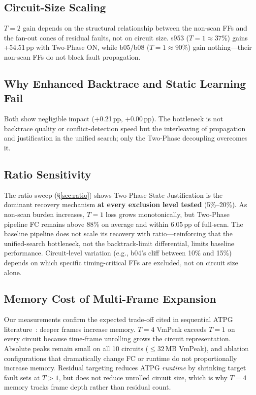 \documentclass[conference]{IEEEtran}
\begin{document}
\subsection{Circuit-Size Scaling}
$T{=}2$ gain depends on the structural relationship between the non-scan FFs and
the fan-out cones of residual faults, not on circuit size. s953 ($T{=}1{\approx}37\%$)
gains +54.51\,pp with Two-Phase ON, while b05/b08 ($T{=}1{\approx}90\%$) gain
nothing---their non-scan FFs do not block fault propagation.

\subsection{Why Enhanced Backtrace and Static Learning Fail}
Both show negligible impact (+0.21\,pp, +0.00\,pp). The bottleneck is not
backtrace quality or conflict-detection speed but the interleaving of
propagation and justification in the unified search; only the Two-Phase
decoupling overcomes it.

\subsection{Ratio Sensitivity}
The ratio sweep (\S\ref{sec:ratio}) shows Two-Phase State Justification is the
dominant recovery mechanism \textbf{at every exclusion level tested} (5\%--20\%).
As non-scan burden increases, $T{=}1$ loss grows monotonically, but Two-Phase
pipeline FC remains above 88\% on average and within 6.05\,pp of full-scan. The
baseline pipeline does not scale its recovery with ratio---reinforcing that the
unified-search bottleneck, not the backtrack-limit differential, limits baseline
performance. Circuit-level variation (e.g., b04's cliff between 10\% and 15\%)
depends on which specific timing-critical FFs are excluded, not on circuit size
alone.

\subsection{Memory Cost of Multi-Frame Expansion}
Our measurements confirm the expected trade-off cited in sequential ATPG
literature~\cite{ref3}: deeper frames increase memory. $T{=}4$ VmPeak exceeds
$T{=}1$ on every circuit because time-frame unrolling grows the circuit
representation. Absolute peaks remain small on all 10 circuits (${\leq}32$\,MB
VmPeak), and ablation configurations that dramatically change FC or runtime do
not proportionally increase memory. Residual targeting reduces ATPG \emph{runtime}
by shrinking target fault sets at $T{>}1$, but does not reduce unrolled circuit
size, which is why $T{=}4$ memory tracks frame depth rather than residual count.
\end{document}
